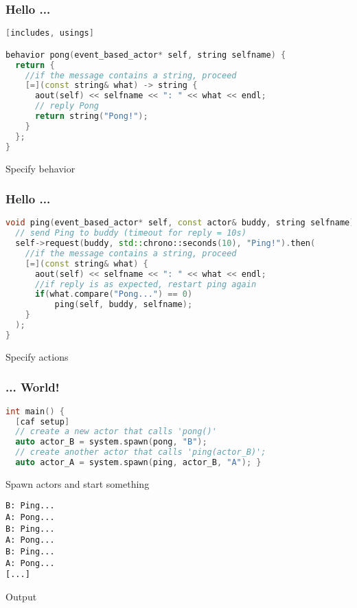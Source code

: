 \begin{frame}[fragile]
\frametitle{Hello ...}
\begin{lstlisting}[language=C++, caption=sample code, frame=single, breaklines]
[includes, usings]

behavior pong(event_based_actor* self, string selfname) {
  return {
    //if the message contains a string, proceed
    [=](const string& what) -> string {
      aout(self) << selfname << ": " << what << endl;
      // reply Pong
      return string("Pong!");
    }
  };
}
\end{lstlisting}
Specify behavior
\end{frame}

\begin{frame}[fragile]
\frametitle{Hello ...}
\begin{lstlisting}[language=C++, caption=sample code, frame=single, breaklines]
void ping(event_based_actor* self, const actor& buddy, string selfname) {
  // send Ping to buddy (timeout for reply = 10s)
  self->request(buddy, std::chrono::seconds(10), "Ping!").then(
    //if the message contains a string, proceed
    [=](const string& what) {
      aout(self) << selfname << ": " << what << endl;
	  //if reply is as expected, restart ping again
	  if(what.compare("Pong...") == 0)
		  ping(self, buddy, selfname);
    }
  );
}
\end{lstlisting}
Specify actions
\end{frame}

\begin{frame}[fragile]
\frametitle{... World!}
\begin{lstlisting}[language=C++, caption=sample code, frame=single, breaklines]
int main() {
  [caf setup]
  // create a new actor that calls 'pong()'
  auto actor_B = system.spawn(pong, "B");
  // create another actor that calls 'ping(actor_B)';
  auto actor_A = system.spawn(ping, actor_B, "A"); }
\end{lstlisting}
Spawn actors and start something
\begin{lstlisting}[frame=single, breaklines]
B: Ping...
A: Pong...
B: Ping...
A: Pong...
B: Ping...
A: Pong...
[...]
\end{lstlisting}
Output
\end{frame}